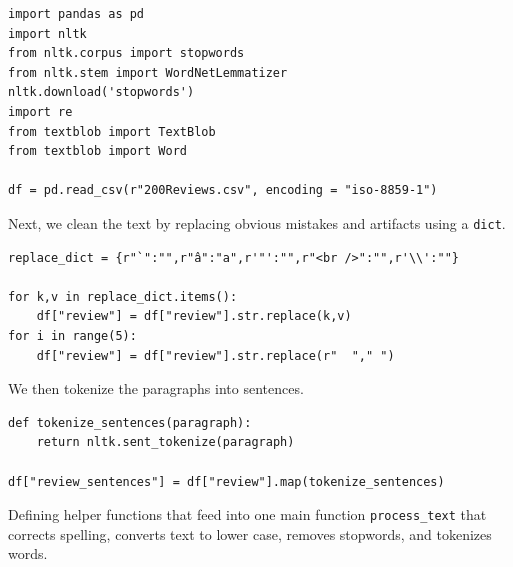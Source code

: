 \documentclass[12pt, letterpaper]{article}
\begin{document}
\begin{mdframed}[backgroundcolor=shadecolor]
\begin{verbatim}
import pandas as pd
import nltk
from nltk.corpus import stopwords
from nltk.stem import WordNetLemmatizer
nltk.download('stopwords')
import re
from textblob import TextBlob
from textblob import Word

df = pd.read_csv(r"200Reviews.csv", encoding = "iso-8859-1")
\end{verbatim}
\end{mdframed}

Next, we clean the text by replacing obvious mistakes and artifacts using a \texttt{dict}.

\begin{mdframed}[backgroundcolor=shadecolor]
\begin{verbatim}
replace_dict = {r"`":"",r"â":"a",r'"':"",r"<br />":"",r'\\':""}

for k,v in replace_dict.items():
    df["review"] = df["review"].str.replace(k,v)
for i in range(5):
    df["review"] = df["review"].str.replace(r"  "," ")
\end{verbatim}
\end{mdframed}

We then tokenize the paragraphs into sentences.

\begin{mdframed}[backgroundcolor=shadecolor]
\begin{verbatim}
def tokenize_sentences(paragraph):
    return nltk.sent_tokenize(paragraph)

df["review_sentences"] = df["review"].map(tokenize_sentences)
\end{verbatim}
\end{mdframed}

Defining helper functions that feed into one main function \texttt{process\_text} that corrects spelling, converts text to lower case, removes stopwords, and tokenizes words.
\end{document}
